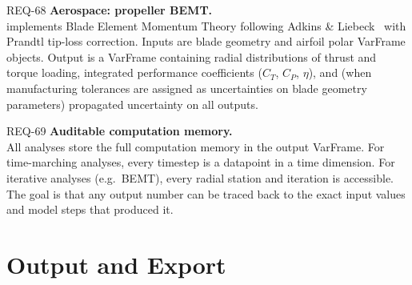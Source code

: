 \begin{reqbox}{REQ-68}{\draft}
\textbf{Aerospace: propeller BEMT.}\\
 implements Blade Element
Momentum Theory following Adkins \& Liebeck~\citep{adkinsLiebeck} with
Prandtl tip-loss correction. Inputs are blade geometry and airfoil polar
VarFrame objects. Output is a VarFrame containing radial distributions of
thrust and torque loading, integrated performance coefficients ($C_T$,
$C_P$, $\eta$), and (when manufacturing tolerances are assigned as uncertainties on blade geometry parameters) propagated uncertainty on
all outputs.
\end{reqbox}

\begin{reqbox}{REQ-69}{\draft}
\textbf{Auditable computation memory.}\\
All  analyses store the full computation memory in
the output VarFrame. For time-marching analyses, every timestep is a
datapoint in a time dimension. For iterative analyses (e.g.\ BEMT), every
radial station and iteration is accessible. The goal is that any output
number can be traced back to the exact input values and model steps that
produced it.
\end{reqbox}

\section{Output and Export}

